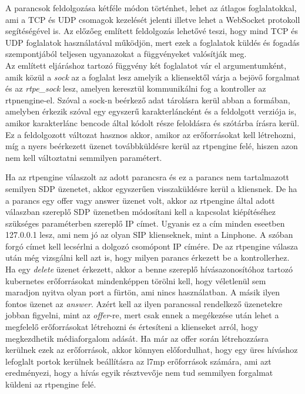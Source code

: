 A parancsok feldolgozása kétféle módon történhet, lehet az átlagos foglalatokkal, ami 
a TCP és UDP csomagok kezelését jelenti illetve lehet a WebSocket protokoll segítéségével 
is. Az előzőeg említett feldolgozás lehetővé teszi, hogy mind TCP és UDP
foglalatok használatával működjön, mert ezek a foglalatok küldés és fogadás szempontjából
teljesen ugyanazokat a függvényeket valósítják meg. \\

Az említett eljáráshoz tartozó függvény két foglalatot vár el argumentumként, amik közül 
a \textit{sock} az a foglalat lesz amelyik a kliensektől várja a bejövő forgalmat és az 
\textit{rtpe\_sock} lesz, amelyen keresztül kommunikálni fog a kontroller az rtpnengine-el. 
Szóval a sock-n beérkező adat tárolásra kerül abban a formában, amelyben érkezik szóval 
egy egyszerű karakterláncként és a feldolgott verziója is, amikor karakterlánc bencode 
által kódolt része feloldásra és szótárba írásra kerül. Ez a feldolgozott változat hasznos 
akkor, amikor az erőforrásokat kell létrehozni, míg a nyers beérkezett üzenet továbbküldésre 
kerül az rtpengine felé, hiszen azon nem kell változtatni semmilyen paramétert.

Ha az rtpengine válaszolt az adott parancsra és ez a parancs nem tartalmazott semilyen 
SDP üzenetet, akkor egyszerűen visszaküldésre kerül a kliensnek. De ha a parancs egy offer
vagy answer üzenet volt, akkor az rtpengine által adott válaszban szereplő SDP üzenetben
módosítani kell a kapcsolat kiépítéséhez szükséges paraméterben szereplő IP címet. Ugyanis
ez a cím minden eseetben 127.0.0.1 lesz, ami nem jó az olyan SIP klienseknek, mint a Linphone.
A szóban forgó címet kell lecsérlni a dolgozó csomópont IP címére. De az rtpengine 
válasza után még vizsgálni kell azt is, hogy milyen parancs érkezett be a kontrollerhez. 
Ha egy \textit{delete} üzenet érkezett, akkor a benne szereplő hívásazonosítóhoz tartozó
kubernetes erőforrásokat mindenképpen törölni kell, hogy véletlenül sem maradjon nyitva
olyan port a fürtön, ami nincs használatban. A másik ilyen fontos üzenet az \textit{answer}.
Azért kell az ilyen parancssal rendelkező üzenetekre jobban figyelni, mint az \textit{offer}-re,
mert csak ennek a megékezése után lehet a megfelelő erőforrásokat létrehozni és értesíteni
a klienseket arról, hogy megkezdhetik médiaforgalom adását. Ha már az offer során 
létrehozzásra kerülnek ezek az erőforrások, akkor könnyen előfordulhat, hogy egy üres híváshoz
lefoglalt portok kerülnek beállításra az l7mp erőforrások számára, ami azt eredményezi, hogy
a hívás egyik résztvevője nem tud semmilyen forgalmat küldeni az rtpengine felé.